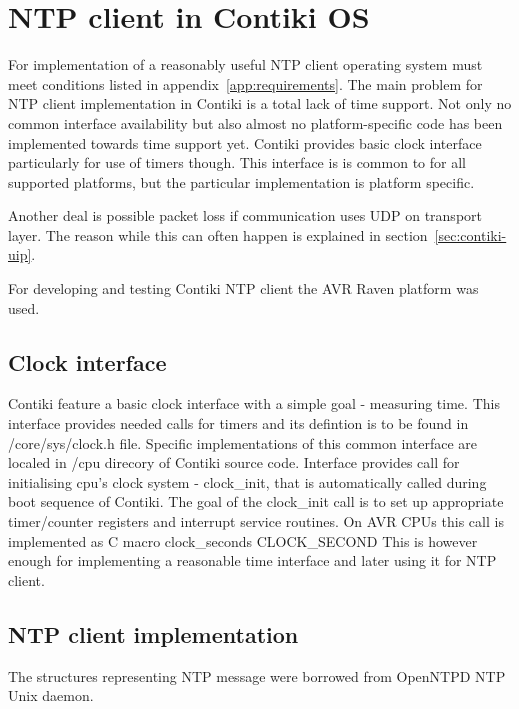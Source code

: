 
\chapter{NTP client in Contiki OS}

For implementation of a reasonably useful NTP client
operating system must meet conditions listed in appendix~\ref{app:requirements}.
The main problem for NTP client implementation in Contiki is a total
lack of time support.
Not only no common interface availability but also
almost no platform-specific code has been implemented towards time support yet.
Contiki provides basic clock interface particularly for use of timers though.
This interface is is common to for all supported platforms, but the particular implementation
is platform specific.

Another deal is possible packet loss if communication uses UDP on transport layer.
The reason while this can often happen is explained in section~\ref{sec:contiki-uip}.

For developing and testing Contiki NTP client the AVR Raven platform was used.

\section{Clock interface}
Contiki feature a basic clock interface with a simple goal - measuring time.
This interface provides needed calls for timers and its defintion is to be found in /core/sys/clock.h file.
Specific implementations of this common interface are localed in /cpu direcory of Contiki source code.
Interface provides call for initialising cpu's clock system - clock_init, that is automatically called during
boot sequence of Contiki.
The goal of the clock_init call is to set up
appropriate timer/counter registers and interrupt service routines.
On AVR CPUs this call is implemented as C macro 
clock_seconds
CLOCK_SECOND
This is however enough for implementing a reasonable time interface and later using it for NTP client.




\section{NTP client implementation}
The structures representing NTP message were borrowed from OpenNTPD NTP Unix daemon.
